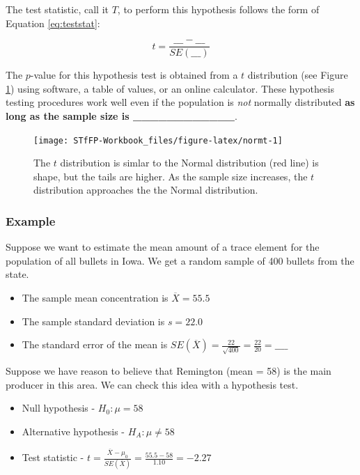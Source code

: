 \documentclass[]{book}
\providecommand{\tightlist}{%
  \setlength{\itemsep}{0pt}\setlength{\parskip}{0pt}}
\theoremstyle{definition}
\theoremstyle{definition}
\theoremstyle{remark}
\begin{document}
The test statistic, call it \(T\), to perform this hypothesis follows
the form of Equation \ref{eq:teststat}:

\begin{equation}\label{eq:Tnorm}
t = \frac{\_\_\_ - \_\_\_}{SE(\_\_\_)}
\end{equation}

The \(p\)-value for this hypothesis test is obtained from a \(t\)
distribution (see Figure \ref{fig:normt}) using software, a table of
values, or an online calculator. These hypothesis testing procedures
work well even if the population is \emph{not} normally distributed
\textbf{as long as the sample size is \_\_\_\_\_\_\_\_\_\_\_\_}.

\begin{figure}[h]

{\centering \texttt{[image: STfFP-Workbook\_files/figure-latex/normt-1]} 

}

\caption{The $t$ distribution is simlar to the Normal distribution (red line) is shape, but the tails are higher. As the sample size increases, the $t$ distribution approaches the the Normal distribution.}\label{fig:normt}
\end{figure}

\subsubsection{Example}\label{example}

Suppose we want to estimate the mean amount of a trace element for the
population of all bullets in Iowa. We get a random sample of 400 bullets
from the state.

\begin{itemize}
\tightlist
\item
  The sample mean concentration is \(\overline{X} = 55.5\) \vspace{.1in}
\item
  The sample standard deviation is \(s = 22.0\) \vspace{.1in}
\item
  The standard error of the mean is
  \(SE(\overline{X}) = \frac{22}{\sqrt{400}} = \frac{22}{20} = \_\_\_\_\)
\end{itemize}

Suppose we have reason to believe that Remington (mean = 58) is the main
producer in this area. We can check this idea with a hypothesis test.

\begin{itemize}
\tightlist
\item
  Null hypothesis - \(H_0 : \mu = 58\)
\item
  Alternative hypothesis - \(H_A : \mu \neq 58\)
\item
  Test statistic -
  \(t = \frac{\overline{X} - \mu_0}{SE(\overline{X})} = \frac{55.5-58}{1.10} = -2.27\)
\end{itemize}
\end{document}
